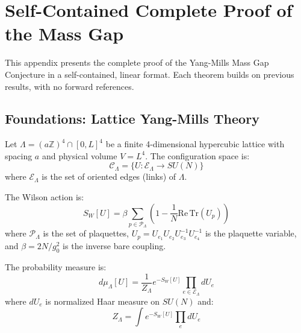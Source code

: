 
\section{Self-Contained Complete Proof of the Mass Gap}
\label{app:self_contained_proof}

This appendix presents the complete proof of the Yang-Mills Mass Gap Conjecture in a self-contained, linear format. Each theorem builds on previous results, with no forward references.


\subsection{Foundations: Lattice Yang-Mills Theory}

\begin{definition}
Let $\Lambda = (a\mathbb{Z})^4 \cap [0, L]^4$ be a finite 4-dimensional hypercubic lattice with spacing $a$ and physical volume $V = L^4$. The configuration space is:
\begin{equation}
\mathcal{C}_\Lambda = \{U : \mathcal{E}_\Lambda \to SU(N)\}
\end{equation}
where $\mathcal{E}_\Lambda$ is the set of oriented edges (links) of $\Lambda$.
\end{definition}

\begin{definition}
The Wilson action is:
\begin{equation}
S_W[U] = \beta \sum_{p \in \mathcal{P}_\Lambda} \left(1 - \frac{1}{N}\mathrm{Re}\,\mathrm{Tr}(U_p)\right)
\end{equation}
where $\mathcal{P}_\Lambda$ is the set of plaquettes, $U_p = U_{e_1} U_{e_2} U_{e_3}^{-1} U_{e_4}^{-1}$ is the plaquette variable, and $\beta = 2N/g_0^2$ is the inverse bare coupling.
\end{definition}

\begin{definition}
The probability measure is:
\begin{equation}
d\mu_\Lambda[U] = \frac{1}{Z_\Lambda} e^{-S_W[U]} \prod_{e \in \mathcal{E}_\Lambda} dU_e
\end{equation}
where $dU_e$ is normalized Haar measure on $SU(N)$ and:
\begin{equation}
Z_\Lambda = \int e^{-S_W[U]} \prod_e dU_e
\end{equation}
\end{definition}

